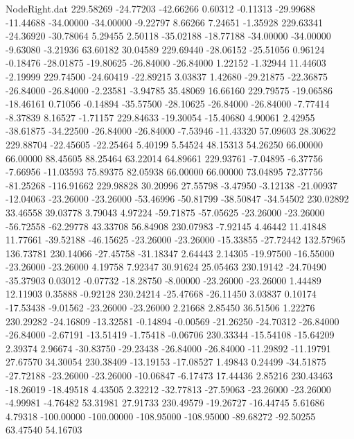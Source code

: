\begin{filecontents}{NodeRight.dat}
 229.58269  -24.77203  -42.66266     0.60312   -0.11313  -29.99688  -11.44688  -34.00000  -34.00000   -9.22797    8.66266    7.24651   -1.35928
 229.63341  -24.36920  -30.78064     5.29455    2.50118  -35.02188  -18.77188  -34.00000  -34.00000   -9.63080   -3.21936   63.60182   30.04589
 229.69440  -28.06152  -25.51056     0.96124   -0.18476  -28.01875  -19.80625  -26.84000  -26.84000    1.22152   -1.32944   11.44603   -2.19999
 229.74500  -24.60419  -22.89215     3.03837    1.42680  -29.21875  -22.36875  -26.84000  -26.84000   -2.23581   -3.94785   35.48069   16.66160
 229.79575  -19.06586  -18.46161     0.71056   -0.14894  -35.57500  -28.10625  -26.84000  -26.84000   -7.77414   -8.37839    8.16527   -1.71157
 229.84633  -19.30054  -15.40680     4.90061    2.42955  -38.61875  -34.22500  -26.84000  -26.84000   -7.53946  -11.43320   57.09603   28.30622
 229.88704  -22.45605  -22.25464     5.40199    5.54524   48.15313   54.26250   66.00000   66.00000   88.45605   88.25464   63.22014   64.89661
 229.93761   -7.04895   -6.37756    -7.66956  -11.03593   75.89375   82.05938   66.00000   66.00000   73.04895   72.37756  -81.25268 -116.91662
 229.98828   30.20996   27.55798    -3.47950   -3.12138  -21.00937  -12.04063  -23.26000  -23.26000  -53.46996  -50.81799  -38.50847  -34.54502
 230.02892   33.46558   39.03778     3.79043    4.97224  -59.71875  -57.05625  -23.26000  -23.26000  -56.72558  -62.29778   43.33708   56.84908
 230.07983   -7.92145    4.46442    11.41848   11.77661  -39.52188  -46.15625  -23.26000  -23.26000  -15.33855  -27.72442  132.57965  136.73781
 230.14066  -27.45758  -31.18347     2.64443    2.14305  -19.97500  -16.55000  -23.26000  -23.26000    4.19758    7.92347   30.91624   25.05463
 230.19142  -24.70490  -35.37903     0.03012   -0.07732  -18.28750   -8.00000  -23.26000  -23.26000    1.44489   12.11903    0.35888   -0.92128
 230.24214  -25.47668  -26.11450     3.03837    0.10174  -17.53438   -9.01562  -23.26000  -23.26000    2.21668    2.85450   36.51506    1.22276
 230.29282  -24.16809  -13.32581    -0.14894   -0.00569  -21.26250  -24.70312  -26.84000  -26.84000   -2.67191  -13.51419   -1.75418   -0.06706
 230.33344  -15.54108  -15.64209     2.39374    2.96674  -30.83750  -29.23438  -26.84000  -26.84000  -11.29892  -11.19791   27.67570   34.30054
 230.38409  -13.19153  -17.08527     1.49843    0.24499  -34.51875  -27.72188  -23.26000  -23.26000  -10.06847   -6.17473   17.44436    2.85216
 230.43463  -18.26019  -18.49518     4.43505    2.32212  -32.77813  -27.59063  -23.26000  -23.26000   -4.99981   -4.76482   53.31981   27.91733
 230.49579  -19.26727  -16.44745     5.61686    4.79318 -100.00000 -100.00000 -108.95000 -108.95000  -89.68272  -92.50255   63.47540   54.16703

\end{filecontents}
